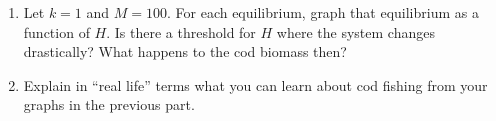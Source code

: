 \begin{enumerate}
\begin{enumerate}
\item 
Let $k=1$ and $M=100$. For each equilibrium, graph that equilibrium as a function of $H$. Is there a threshold for $H$ where the system changes drastically? What happens to the cod biomass then?

\item Explain in ``real life'' terms what you can learn about cod fishing from your graphs in the previous part.

\end{enumerate}


	
	    



\end{enumerate}